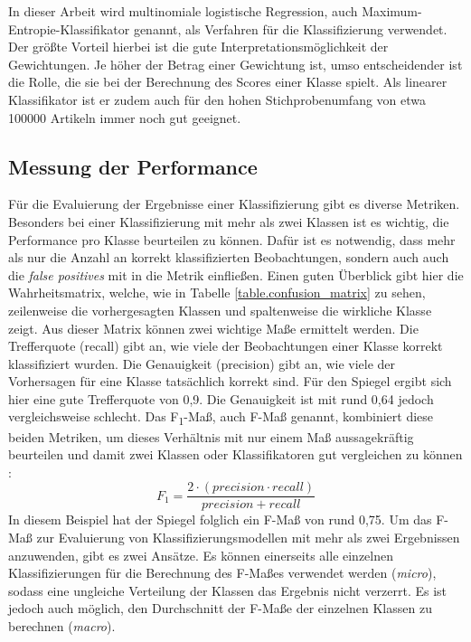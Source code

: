 In dieser Arbeit wird multinomiale logistische Regression, auch Maximum-Entropie-Klassifikator genannt, als Verfahren für die Klassifizierung verwendet. Der größte Vorteil hierbei ist die gute Interpretationsmöglichkeit der Gewichtungen. Je höher der Betrag einer Gewichtung ist, umso entscheidender ist die Rolle, die sie bei der Berechnung des Scores einer Klasse spielt. Als linearer Klassifikator ist er zudem auch für den hohen Stichprobenumfang von etwa 100000 Artikeln immer noch gut geeignet.

\subsection{Messung der Performance}
Für die Evaluierung der Ergebnisse einer Klassifizierung gibt es diverse Metriken. Besonders bei einer Klassifizierung mit mehr als zwei Klassen ist es wichtig, die Performance pro Klasse beurteilen zu können. Dafür ist es notwendig, dass mehr als nur die Anzahl an korrekt klassifizierten Beobachtungen, sondern auch auch die \textit{false positives} mit in die Metrik einfließen. Einen guten Überblick gibt hier die Wahrheitsmatrix, welche, wie in Tabelle \ref{table.confusion_matrix} zu sehen, zeilenweise die vorhergesagten Klassen und spaltenweise die wirkliche Klasse zeigt. Aus dieser Matrix können zwei wichtige Maße ermittelt werden. Die Trefferquote (recall) gibt an, wie viele der Beobachtungen einer Klasse korrekt klassifiziert wurden. Die Genauigkeit (precision) gibt an, wie viele der Vorhersagen für eine Klasse tatsächlich korrekt sind. Für den Spiegel ergibt sich hier eine gute Trefferquote von 0,9. Die Genauigkeit ist mit rund 0,64 jedoch vergleichsweise schlecht. Das F\textsubscript{1}-Maß, auch F-Maß genannt, kombiniert diese beiden Metriken, um dieses Verhältnis mit nur einem Maß aussagekräftig beurteilen und damit zwei Klassen oder Klassifikatoren gut vergleichen zu können \cite[S.~88-89]{geron2017hands}:
\[ F_1 = \frac{2 \cdot (precision \cdot recall)}{precision + recall} \]
In diesem Beispiel hat der Spiegel folglich ein F-Maß von rund 0,75. Um das F-Maß zur Evaluierung von Klassifizierungsmodellen mit mehr als zwei Ergebnissen anzuwenden, gibt es zwei Ansätze. Es können einerseits alle einzelnen Klassifizierungen für die Berechnung des F-Maßes verwendet werden (\textit{micro}), sodass eine ungleiche Verteilung der Klassen das Ergebnis nicht verzerrt. Es ist jedoch auch möglich, den Durchschnitt der F-Maße der einzelnen Klassen zu berechnen (\textit{macro}).

